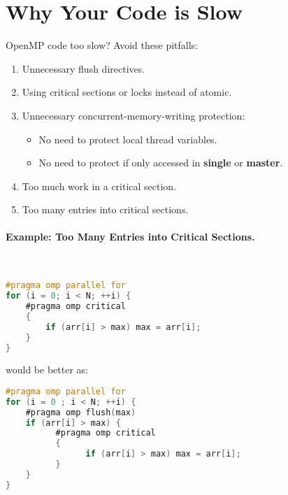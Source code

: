 \section*{Why Your Code is Slow}
OpenMP code too slow? Avoid these pitfalls:
  \begin{enumerate}
    \item Unnecessary flush directives.
    \item Using critical sections or locks instead of atomic.
    \item Unnecessary concurrent-memory-writing protection:
      \begin{itemize}
        \item No need to protect local thread variables.
        \item No need to protect if only accessed in {\bf single} or
          {\bf master}.
      \end{itemize}
    \item Too much work in a critical section.
    \item Too many entries into critical sections.
  \end{enumerate}

\paragraph{Example: Too Many Entries into Critical Sections.}~

  \begin{lstlisting}[language=C]
#pragma omp parallel for
for (i = 0; i < N; ++i) { 
    #pragma omp critical
    {
        if (arr[i] > max) max = arr[i];
    } 
}
  \end{lstlisting}

would be better as:

  \begin{lstlisting}[language=C]
#pragma omp parallel for
for (i = 0 ; i < N; ++i) { 
    #pragma omp flush(max)
    if (arr[i] > max) {
          #pragma omp critical
          {
                if (arr[i] > max) max = arr[i];
          }
    }
}
\end{lstlisting}





